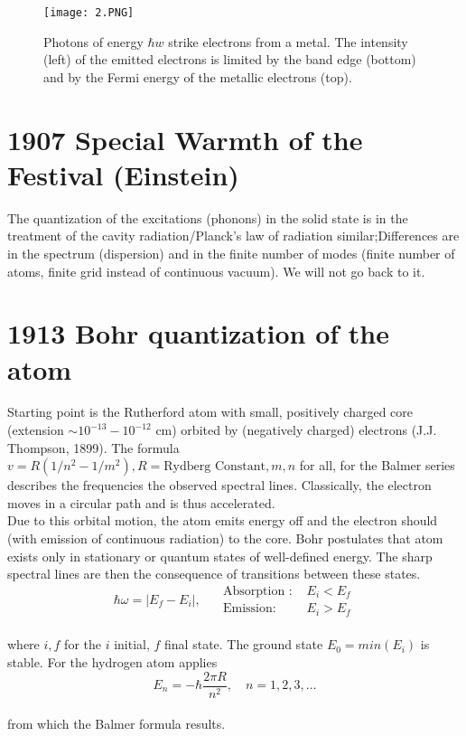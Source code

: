 \begin{figure}[ht]
    \centering
    \texttt{[image: 2.PNG]}
    \caption{Photons of energy $\hbar w$ strike electrons from a metal. The intensity (left) of the emitted electrons is limited by the band edge (bottom) and by the Fermi energy of the metallic electrons (top).}
    \label{fig:2}
\end{figure}
\section{1907 Special Warmth of the Festival (Einstein)}
The quantization of the excitations (phonons) in the solid state is in the treatment of the cavity radiation/Planck's law of radiation similar;Differences are in the spectrum (dispersion) and in the finite number of modes (finite number of atoms, finite grid instead of continuous vacuum). We will not go back to it.

\section{1913 Bohr quantization of the atom}
Starting point is the Rutherford atom with small, positively charged core (extension $\sim10^{-13} - 10^{-12}$ cm) orbited by (negatively charged) electrons (J.J. Thompson, 1899). The formula $v=R(1/n^2 - 1/m^2), R = \text{Rydberg Constant}, m, n$ for all, for the Balmer series describes the frequencies the observed spectral lines. Classically, the electron moves in a circular path and is thus accelerated.\\
Due to this orbital motion, the atom emits energy off and the electron should (with emission of continuous radiation) to the core. Bohr postulates that atom exists only in stationary or quantum states of well-defined energy. The sharp spectral lines are then the consequence of transitions between these states.
\\
\begin{equation}
\hbar \omega=\left|E_{f}-E_{i}\right|, \quad \begin{array}{ll}{\text { Absorption : }} & {E_{i}<E_{f}} \\ {\text { Emission: }} & {E_{i}>E_{f}}\end{array}
\end{equation}\\
where $i,f$ for the $i$ initial, $f$ final state. The ground state $E_0 =min (E_i)$ is stable. For the hydrogen atom applies \\
\begin{equation}
E_{n}=-\hbar \frac{2 \pi R}{n^{2}}, \quad n=1,2,3, \ldots
\end{equation}\\
from which the Balmer formula results.

